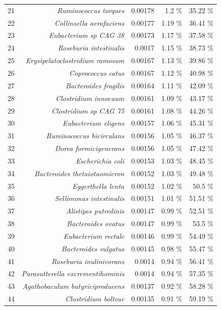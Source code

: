 \documentclass{article}
\begin{document}
\begin{table}
\begin{centering}
\begin{tabular}{|r|r|r|r|r|}
  21 & \textit{Ruminococcus torques} & 0.00178 & 1.2 \% & 35.22 \% \\
  22 & \textit{Collinsella aerofaciens} & 0.00177 & 1.19 \% & 36.41 \% \\
  23 & \textit{Eubacterium sp CAG 38} & 0.00173 & 1.17 \% & 37.58 \% \\
  24 & \textit{Roseburia intestinalis} & 0.0017 & 1.15 \% & 38.73 \% \\
  25 & \textit{Erysipelatoclostridium ramosum} & 0.00167 & 1.13 \% & 39.86 \% \\
  26 & \textit{Coprococcus catus} & 0.00167 & 1.12 \% & 40.98 \% \\
  27 & \textit{Bacteroides fragilis} & 0.00164 & 1.11 \% & 42.09 \% \\
  28 & \textit{Clostridium innocuum} & 0.00161 & 1.09 \% & 43.17 \% \\
  29 & \textit{Clostridium sp CAG 75} & 0.00161 & 1.08 \% & 44.26 \% \\
  30 & \textit{Eubacterium eligens} & 0.00157 & 1.06 \% & 45.31 \% \\
  31 & \textit{Ruminococcus bicirculans} & 0.00156 & 1.05 \% & 46.37 \% \\
  32 & \textit{Dorea formicigenerans} & 0.00156 & 1.05 \% & 47.42 \% \\
  33 & \textit{Escherichia coli} & 0.00153 & 1.03 \% & 48.45 \% \\
  34 & \textit{Bacteroides thetaiotaomicron} & 0.00152 & 1.03 \% & 49.48 \% \\
  35 & \textit{Eggerthella lenta} & 0.00152 & 1.02 \% & 50.5 \% \\
  36 & \textit{Sellimonas intestinalis} & 0.00151 & 1.01 \% & 51.51 \% \\
  37 & \textit{Alistipes putredinis} & 0.00147 & 0.99 \% & 52.51 \% \\
  38 & \textit{Bacteroides ovatus} & 0.00147 & 0.99 \% & 53.5 \% \\
  39 & \textit{Eubacterium rectale} & 0.00146 & 0.99 \% & 54.49 \% \\
  40 & \textit{Bacteroides vulgatus} & 0.00145 & 0.98 \% & 55.47 \% \\
  41 & \textit{Roseburia inulinivorans} & 0.0014 & 0.94 \% & 56.41 \% \\
  42 & \textit{Parasutterella excrementihominis} & 0.0014 & 0.94 \% & 57.35 \% \\
  43 & \textit{Agathobaculum butyriciproducens} & 0.00137 & 0.92 \% & 58.28 \% \\
  44 & \textit{Clostridium bolteae} & 0.00135 & 0.91 \% & 59.19 \% \\

\end{tabular}
\end{centering}
\end{table}
\end{document}
